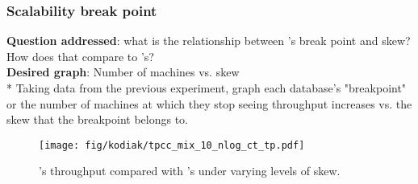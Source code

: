 \subsubsection{Scalability break point}
\label{sec:break}
\textbf{Question addressed}: what is the relationship between \name{}'s break point and skew? How does that compare to \dsdb{}'s?\\
\textbf{Desired graph}: Number of machines vs. skew\\
* Taking data from the previous experiment, graph each database's "breakpoint" or the number of machines at which they stop seeing throughput increases vs. the skew that the breakpoint belongs to.\\

\begin{figure}[t]
  \texttt{[image: fig/kodiak/tpcc\_mix\_10\_nlog\_ct\_tp.pdf]}
  \caption{\name{}'s throughput compared with \dsdb{}'s under varying levels of skew.}
  \label{fig:breakpoint}
\end{figure}
